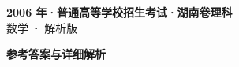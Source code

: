 \documentclass[zihao=-4, a4paper]{ctexart}
\begin{document}
\begin{center}
  {\Large\bfseries 2006 年·普通高等学校招生考试·湖南卷理科}\\[4pt]
  {\large 数学 · 解析版}
\end{center}
\medskip
{}

\clearpage
{}
\begin{center}{\Large\bfseries 参考答案与详细解析}\end{center}
\medskip

\end{document}
